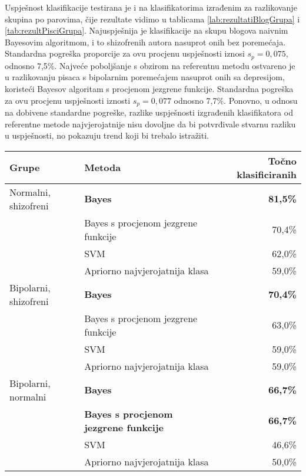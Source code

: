 \documentclass[10pt, a4paper]{article}
\begin{document}
Uspješnost klasifikacije testirana je i na klasifikatorima izrađenim za razlikovanje skupina po parovima, čije rezultate vidimo u tablicama \ref{lab:rezultatiBlogGrupa} i \ref{tab:rezultPisciGrupa}. Najuspješnija je klasifikacije na skupu blogova naivnim Bayesovim algoritmom, i to shizofrenih autora nasuprot onih bez poremećaja. Standardna pogreška proporcije za ovu procjenu uspješnosti iznosi $s_p = 0,075$, odnosno 7,5\%. Najveće poboljšanje s obzirom na referentnu metodu ostvareno je u razlikovanju pisaca s bipolarnim poremećajem nasuprot onih sa depresijom, koristeći Bayesov algoritam s procjenom jezgrene funkcije. Standardna pogreška za ovu procjenu uspješnosti iznosti $s_p = 0,077$ odnosno 7,7\%. Ponovno, u odnosu na dobivene standardne pogreške, razlike uspješnosti izgrađenih klasifikatora od referentne metode najvjerojatnije nisu dovoljne da bi potvrđivale stvarnu razliku u uspješnosti, no pokazuju trend koji bi trebalo istražiti.

\begin{table*}
\caption{Postotak točno klasificiranih primjera na skupu blogova po parovima klasa korištenjem različitih algoritama.}
\label{lab:rezultatiBlogGrupa}
\begin{center}
\begin{tabular}{llr}
\toprule
Grupe & Metoda & Točno klasificiranih\\
\midrule
Normalni, shizofreni & \textbf{Bayes} & \textbf{81,5\%}\\
 & Bayes s procjenom jezgrene funkcije & 70,4\%\\
 & SVM & 62,0\%\\
 & Apriorno najvjerojatnija klasa & 59,0\%\\
\midrule
 Bipolarni, shizofreni &   \textbf{Bayes} &   \textbf{70,4\%}\\
 & Bayes s procjenom jezgrene funkcije & 63,0\%\\
 & SVM & 59,0\%\\
 & Apriorno najvjerojatnija klasa & 59,0\%\\
\midrule
Bipolarni, normalni & \textbf{Bayes} &  \textbf{66,7\%}\\
 &  \textbf{Bayes s procjenom jezgrene funkcije} &  \textbf{66,7\%}\\
 & SVM & 46,6\%\\
 & Apriorno najvjerojatnija klasa & 50,0\%\\
 \bottomrule
 \end{tabular}
 \end{center}
 \end{table*}
\end{document}
